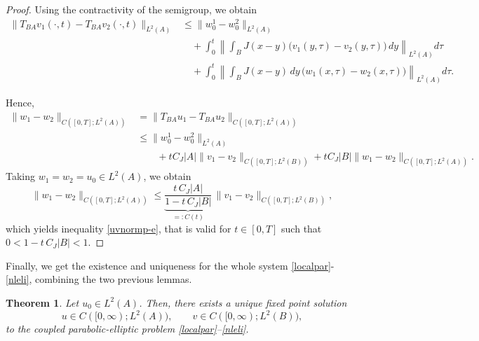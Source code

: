 \documentclass[reqno]{amsart}
\numberwithin{equation}{section}
\newtheorem{theorem}{Theorem}[section]
\begin{document}
\begin{proof}
Using the contractivity of the semigroup, we obtain
\begin{align*}
\|T_{BA}v_1(\cdot,t)-T_{BA}v_2(\cdot,t)\|_{L^2(A)} 
&\le 
\|w_0^1 - w_0^2\|_{L^2(A)}   \\
&\quad +
\int_0^t
\left\|
  \int_B J(x-y)\big( v_1(y,\tau) - v_2(y,\tau) \big)\,dy
\right\|_{L^2(A)} d\tau \\
&\quad +
\int_0^t
\left\|
  \int_B J(x-y)\,dy \, \big( w_1(x,\tau)-w_2(x,\tau) \big)
\right\|_{L^2(A)} d\tau .
\end{align*}

Hence,
\begin{align*}
\|w_1 - w_2\|_{C([0,T];L^2(A))}
&= 
\|T_{BA}u_1 - T_{BA}u_2\|_{C([0,T];L^2(A))}
\\
&\le \|w_0^1 - w_0^2\|_{L^2(A)} \\
& \qquad 
+ t C_J |A| \|v_1 - v_2\|_{C([0,T];L^2(B))}
+ t C_J |B| \|w_1 - w_2\|_{C([0,T];L^2(A))}.
\end{align*}
Taking $w_1 = w_2 = u_0\in L^2(A)$, 
we obtain
\[
\|w_1 - w_2\|_{C([0,T];L^2(A))}
\le 
\underbrace{
\frac{t\, C_J |A|}{1 - t\, C_J |B|}
}_{=:C(t)}
\,
\|v_1 - v_2\|_{C([0,T];L^2(B))},
\]
which yields inequality \eqref{uvnormp-e}, that is valid for $t\in [0,T]$ such that $0<1 - t\, C_J |B|<1$.
\end{proof}

Finally, we get the existence and uniqueness for the whole 
system \eqref{localpar}-\eqref{nleli}, combining the two previous lemmas.


\begin{theorem}\label{EUp-e}
Let $u_0\in L^2(A)$.
Then, there exists a unique fixed point solution 
\[
u\in C([0,\infty);L^2(A)), \qquad v\in C([0,\infty);L^2(B)),
\]
to the coupled parabolic-elliptic problem
\eqref{localpar}--\eqref{nleli}.
\end{theorem}
\end{document}
